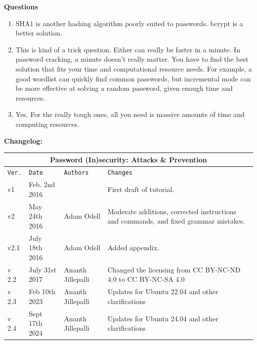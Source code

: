 \documentclass[12pt]{extarticle}
\newcommand{\ben}{\begin{enumerate}}
\newcommand{\een}{\end{enumerate}}
\begin{document}
	\textbf{Questions}
	
	\ben
	
	\item SHA1 is another hashing algorithm poorly suited to passwords. bcrypt is a better solution. \\
	\item This is kind of a trick question. Either can really be faster in a minute. In password cracking, a minute doesn't really matter. You have to find the best solution that fits your time and computational resource needs. For example, a good wordlist can quickly find common passwords, but incremental mode can be more effective at solving a random password, given enough time and resources. \\
	\item Yes. For the really tough ones, all you need is massive amounts of time and computing resources.	
	
	\een
	
	
	\textbf{Changelog:}
	\label{changelog}
	\vspace{6mm}
	
	
	\begin{tabular}{ |p{1cm}|p{3cm}|p{3cm}|p{5cm}|  }
		\hline
		\multicolumn{4}{|c|}{Password (In)security: Attacks \& Prevention} \\
		\hline
		\texttt{Ver.} & \texttt{Date} & \texttt{Authors} & \texttt{Changes} \\
		\hline
		v1 & Feb. 2nd 2016 & \theauthor & First draft of tutorial. \\
		\hline
		v2 & May  24th 2016 & Adam Odell & Moderate additions, corrected instructions and commands, and fixed grammar mistakes. \\
		\hline
		v2.1 & July 18th 2016 & Adam Odell & Added appendix. \\ \hline
		v 2.2 & July 31st 2017 & Ananth Jillepalli & Changed the licensing from CC BY-NC-ND 4.0 to CC BY-NC-SA 4.0 \\  \hline
		v 2.3 & Feb 10th 2023 & Ananth Jillepalli & Updates for Ubuntu 22.04 and other clarifications \\  \hline
		v 2.4 & Sept 17th 2024 & Ananth Jillepalli & Updates for Ubuntu 24.04 and other clarifications \\  \hline
	\end{tabular}
	
	\pagebreak
	
	
\end{document}
